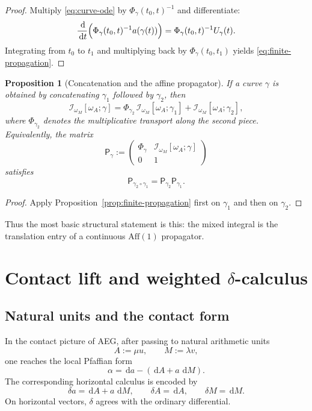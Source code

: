 \documentclass[11pt]{article}
\newtheorem{proposition}{Proposition}
\newcommand{\dd}{\,\mathrm{d}}
\newcommand{\Aff}{\mathrm{Aff}}
\newcommand{\del}{\delta}
\newcommand{\Ipath}{\mathcal{I}}
\begin{document}
\begin{proof}
Multiply \eqref{eq:curve-ode} by $\Phi_\gamma(t_0,t)^{-1}$ and differentiate:
\[
\frac{\dd}{\dd t}\Bigl(\Phi_\gamma(t_0,t)^{-1}a(\gamma(t))\Bigr)
=
\Phi_\gamma(t_0,t)^{-1}U_\gamma(t).
\]
Integrating from $t_0$ to $t_1$ and multiplying back by $\Phi_\gamma(t_0,t_1)$ yields \eqref{eq:finite-propagation}.
\end{proof}

\begin{proposition}[Concatenation and the affine propagator]
\label{prop:affine-propagator}
If a curve $\gamma$ is obtained by concatenating $\gamma_1$ followed by $\gamma_2$, then
\begin{equation}
\label{eq:concatenation-law}
\Ipath_{\omega_M}[\omega_A;\gamma]
=
\Phi_{\gamma_2}\,\Ipath_{\omega_M}[\omega_A;\gamma_1]
+
\Ipath_{\omega_M}[\omega_A;\gamma_2],
\end{equation}
where $\Phi_{\gamma_2}$ denotes the multiplicative transport along the second piece.
Equivalently, the matrix
\begin{equation}
\label{eq:affine-matrix}
\mathsf P_\gamma:=
\begin{pmatrix}
\Phi_\gamma & \Ipath_{\omega_M}[\omega_A;\gamma]\\
0 & 1
\end{pmatrix}
\end{equation}
satisfies
\[
\mathsf P_{\gamma_2\circ\gamma_1}=\mathsf P_{\gamma_2}\mathsf P_{\gamma_1}.
\]
\end{proposition}

\begin{proof}
Apply Proposition~\ref{prop:finite-propagation} first on $\gamma_1$ and then on $\gamma_2$.
\end{proof}

Thus the most basic structural statement is this: the mixed integral is the translation entry of a continuous $\Aff(1)$ propagator.

\section{Contact lift and weighted $\delta$-calculus}

\subsection{Natural units and the contact form}

In the contact picture of AEG, after passing to natural arithmetic units
\[
A:=\mu u,
\qquad
M:=\lambda v,
\]
one reaches the local Pfaffian form
\begin{equation}
\label{eq:contact-form}
\alpha=\dd a-(\dd A+a\,\dd M).
\end{equation}
The corresponding horizontal calculus is encoded by
\begin{equation}
\label{eq:delta-a}
\del a=\dd A+a\,\dd M,
\qquad
\del A=\dd A,
\qquad
\del M=\dd M.
\end{equation}
On horizontal vectors, $\del$ agrees with the ordinary differential.
\end{document}
